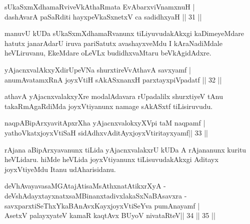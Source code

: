 \begin{shl}
sUkaSxmXdhamaRviveVkAthaRmata EvAbarxviVnamxnuH | \\
\footnotemark[1]{}dashAvarA paSaRditi hayxpeVkaSxnetxV ca sadidhxyaH \hfill||  31 ||  
\end{shl}

\begin{artha}
manuvU kUDa sUkaSxmXdhamaRvanunx tiLiyuvudakAkxgi kaDimeyeMdare hatutx janarAdarU iruva pariSatutx avashayxveMdu I kAraNadiMdale heVLiruvanu, EkeMdare oLeVLx budidhxvaMtaru beVkAgidAdxre.
\end{artha}

\begin{shl}
yAjacnxvalAkxyXdirUpeVNa shurxtireVvAthavA savxyamf | \\
anumAvatamxRnA joyxVtiH sAkASxnanxH parxtayxpiVpadatf \hfill ||  32 ||  
\end{shl}

\begin{artha}
athavA yAjacnxvalakxyXre modalAdavara rUpadalilx shurxtiyeV tAnu takaRmAgaRdiMda joyxVtiyanunx namage sAkASxtf tiLisiruvudu.
\end{artha}

\begin{shl}
naqpABipArxyavitApxrXha yAjacnxvalokxyXV\s pi taM naqpamf | \\
yathoVkatxjoyxVtiSaH sidAdhxvAditAyxjoyxVtiritayxyamf\hfill ||  33 ||  
\end{shl}

\begin{artha}
rAjana aBipArxyavanunx tiLida yAjacnxvalakxrU kUDa A rAjananunx kuritu heVLidaru. hiMde heVLida joyxVtiyanunx tiLisuvudakAkxgi Aditayx joyxVtiyeMdu Itanu udAharisidanu.
\end{artha}

\begin{shl}
deVhAvayavasaMGAtajAtisaMsAthxnatAtikxrXyA -\\
deVshAdayxtayxnatxsaMBinanxtadivxlakaSxNaBAsavxra - \\
savxparxtiSeThxYkaBAnAvxKayxjoyxVtiSeYva pumAnayamf | \\
AsetxV palayxyateV kamaR kaqtAvx BUyoV nivataRteV\hfill ||  34 ||  35 ||  
\end{shl}

